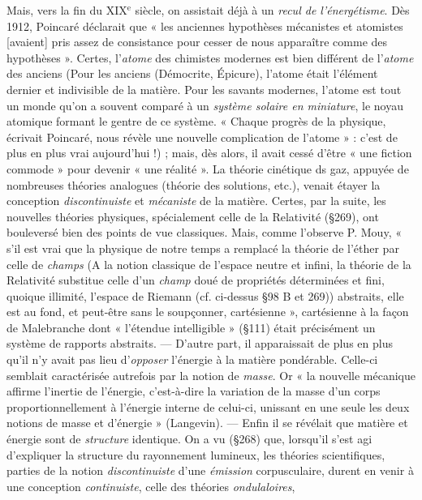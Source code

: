 {Mais, vers la fin du {\footnotesize XIX}$^\text{e}$ siècle, on assistait déjà à un {\it recul de l'énergétisme}.
Dès 1912, Poincaré déclarait que « les anciennes hypothèses mécanistes
et atomistes [avaient] pris assez de consistance pour cesser de nous
apparaître comme des hypothèses ». Certes, l'{\it atome} des chimistes modernes
est bien différent de l'{\it atome} des anciens
{\scriptsize (Pour les anciens (Démocrite, Épicure), l'atome était l'élément dernier et indivisible
de la matière. Pour les savants modernes, l'atome est tout un monde qu'on a souvent
comparé à un {\it système solaire en miniature}, le noyau atomique formant le gentre de ce
système. « Chaque progrès de la physique, écrivait Poincaré, nous révèle une nouvelle
complication de l’atome » : c’est de plus en plus vrai aujourd’hui !)}
; mais, dès alors, il avait cessé d’être
« une fiction commode » pour devenir « une réalité ». La théorie cinétique
ds gaz, appuyée de nombreuses théories analogues (théorie des solutions, etc.),
venait étayer la conception {\it discontinuiste} et {\it mécaniste} de la matière. Certes,
par la suite, les nouvelles théories physiques, spécialement celle de la Relativité
(\S 269), ont bouleversé bien des points de vue classiques. Mais, comme
l’observe P. Mouy, « s’il est vrai que la physique de notre temps a remplacé
la théorie de l’éther par celle de \textsf{\textit {champs}}
{\scriptsize (A la notion classique de l’espace neutre et infini, la théorie de la Relativité substitue
celle d'un {\it champ} doué de propriétés déterminées et fini, quoique illimité, l'espace
de Riemann (cf. ci-dessus \S 98 B et 269))}
abstraits, elle est au fond, et peut-être
sans le soupçonner, cartésienne », cartésienne à la façon de Malebranche
dont « l'étendue intelligible » (\S 111) était précisément un système de rapports
abstraits. — D'autre part, il apparaissait de plus en plus qu'il n'y
avait pas lieu d’{\it opposer} l'énergie à la matière pondérable. Celle-ci semblait
caractérisée autrefois par la notion de {\it masse}. Or « la nouvelle mécanique
affirme l’inertie de l'énergie, c'est-à-dire la variation de la masse d’un corps
proportionnellement à l’énergie interne de celui-ci, unissant en une seule les
deux notions de masse et d'énergie » (Langevin). — Enfin il se révélait que
matière et énergie sont de {\it structure} identique. On a vu (\S 268) que, lorsqu'il
s’est agi d'expliquer la structure du rayonnement lumineux, les théories
scientifiques, parties de la notion {\it discontinuiste} d’une {\it émission} corpusculaire,
durent en venir à une conception {\it continuiste}, celle des théories {\it ondulaloires},
}
